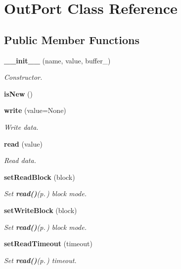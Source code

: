 \section{Out\-Port Class Reference}
\label{classOutPort}
\subsection*{Public Member Functions}
\begin{CompactItemize}
\item 
{\bf \_\-\_\-init\_\-\_\-} (name, value, buffer\_\-)
\begin{CompactList}\small\item\em Constructor. \item\end{CompactList}\item 
{\bf is\-New} ()
\item 
{\bf write} (value=None)
\begin{CompactList}\small\item\em Write data. \item\end{CompactList}\item 
{\bf read} (value)
\begin{CompactList}\small\item\em Read data. \item\end{CompactList}\item 
{\bf set\-Read\-Block} (block)
\begin{CompactList}\small\item\em Set {\bf read()}{\rm (p.\,\pageref{classOutPort_OutPorta3})} block mode. \item\end{CompactList}\item 
{\bf set\-Write\-Block} (block)
\begin{CompactList}\small\item\em Set {\bf read()}{\rm (p.\,\pageref{classOutPort_OutPorta3})} block mode. \item\end{CompactList}\item 
{\bf set\-Read\-Timeout} (timeout)
\begin{CompactList}\small\item\em Set {\bf read()}{\rm (p.\,\pageref{classOutPort_OutPorta3})} timeout. \item\end{CompactList}\item 

\end{CompactItemize}
